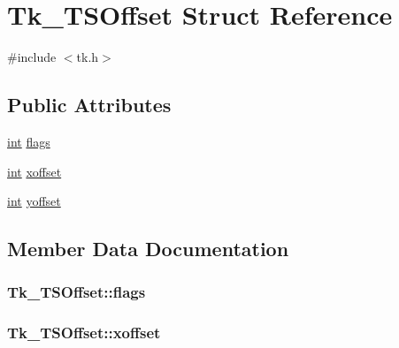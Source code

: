 \hypertarget{struct_tk___t_s_offset}{}\section{Tk\+\_\+\+T\+S\+Offset Struct Reference}
\label{struct_tk___t_s_offset}


{\ttfamily \#include $<$tk.\+h$>$}

\subsection*{Public Attributes}
\begin{DoxyCompactItemize}
\item 
\hyperlink{tk_8h_a83f82f76e7fed06f4c49d2db94028a6d}{int} \hyperlink{struct_tk___t_s_offset_a3d5d97c2a18216a2f8830ffa8b74c21b}{flags}
\item 
\hyperlink{tk_8h_a83f82f76e7fed06f4c49d2db94028a6d}{int} \hyperlink{struct_tk___t_s_offset_a0e997d5fe16a40439797b51b94ca0fa9}{xoffset}
\item 
\hyperlink{tk_8h_a83f82f76e7fed06f4c49d2db94028a6d}{int} \hyperlink{struct_tk___t_s_offset_a90258dbc306549c161476e4766b5ce0a}{yoffset}
\end{DoxyCompactItemize}


\subsection{Member Data Documentation}
\subsubsection[{\texorpdfstring{flags}{flags}}]{ Tk\+\_\+\+T\+S\+Offset\+::flags}\hypertarget{struct_tk___t_s_offset_a3d5d97c2a18216a2f8830ffa8b74c21b}{}\label{struct_tk___t_s_offset_a3d5d97c2a18216a2f8830ffa8b74c21b}
\subsubsection[{\texorpdfstring{xoffset}{xoffset}}]{ Tk\+\_\+\+T\+S\+Offset\+::xoffset}\hypertarget{struct_tk___t_s_offset_a0e997d5fe16a40439797b51b94ca0fa9}{}\label{struct_tk___t_s_offset_a0e997d5fe16a40439797b51b94ca0fa9}
